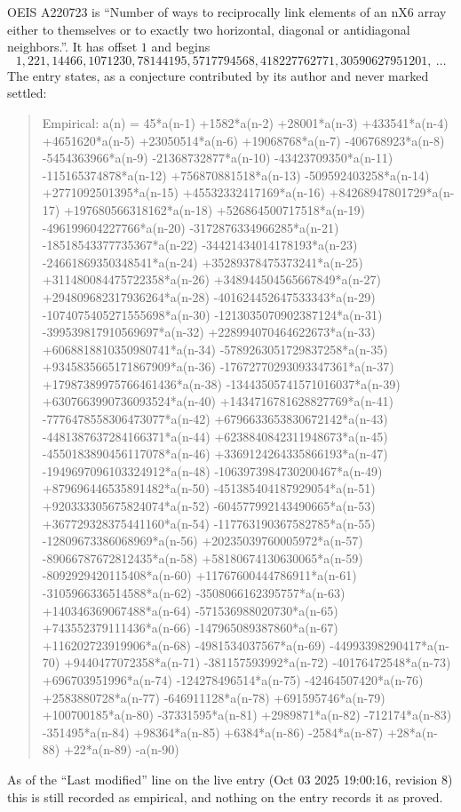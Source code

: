 \documentclass[11pt,a4paper]{article}
\theoremstyle{plain}
\theoremstyle{definition}
\begin{document}
OEIS A220723 is ``Number of ways to reciprocally link elements of an nX6 array either to themselves or to exactly two horizontal, diagonal or antidiagonal neighbors.''. It has offset $1$ and begins
\[
1, 221, 14466, 1071230, 78144195, 5717794568, 418227762771, 30590627951201,\ \dots
\]
The entry states, as a conjecture contributed by its author and never marked settled:
\begin{quote}
Empirical: a(n) = 45*a(n-1) +1582*a(n-2) +28001*a(n-3) +433541*a(n-4) +4651620*a(n-5) +23050514*a(n-6) +19068768*a(n-7) -406768923*a(n-8) -5454363966*a(n-9) -21368732877*a(n-10) -43423709350*a(n-11) -115165374878*a(n-12) +756870881518*a(n-13) -509592403258*a(n-14) +2771092501395*a(n-15) +45532332417169*a(n-16) +84268947801729*a(n-17) +197680566318162*a(n-18) +526864500717518*a(n-19) -496199604227766*a(n-20) -3172876334966285*a(n-21) -18518543377735367*a(n-22) -34421434014178193*a(n-23) -24661869350348541*a(n-24) +35289378475373241*a(n-25) +311480084475722358*a(n-26) +348944504565667849*a(n-27) +294809682317936264*a(n-28) -401624452647533343*a(n-29) -1074075405271555698*a(n-30) -1213035070902387124*a(n-31) -399539817910569697*a(n-32) +228994070464622673*a(n-33) +6068818810350980741*a(n-34) -5789263051729837258*a(n-35) +9345835665171867909*a(n-36) -17672770293093347361*a(n-37) +17987389975766461436*a(n-38) -13443505741571016037*a(n-39) +6307663990736093524*a(n-40) +1434716781628827769*a(n-41) -7776478558306473077*a(n-42) +6796633653830672142*a(n-43) -4481387637284166371*a(n-44) +6238840842311948673*a(n-45) -4550183890456117078*a(n-46) +3369124264335866193*a(n-47) -1949697096103324912*a(n-48) -1063973984730200467*a(n-49) +879696446535891482*a(n-50) -451385404187929054*a(n-51) +920333305675824074*a(n-52) -604577992143490665*a(n-53) +367729328375441160*a(n-54) -117763190367582785*a(n-55) -12809673386068969*a(n-56) +20235039760005972*a(n-57) -89066787672812435*a(n-58) +58180674130630065*a(n-59) -8092929420115408*a(n-60) +11767600444786911*a(n-61) -3105966336514588*a(n-62) -3508066162395757*a(n-63) +140346369067488*a(n-64) -571536988020730*a(n-65) +743552379111436*a(n-66) -147965089387860*a(n-67) +116202723919906*a(n-68) -4981534037567*a(n-69) -44993398290417*a(n-70) +9440477072358*a(n-71) -381157593992*a(n-72) -40176472548*a(n-73) +696703951996*a(n-74) -124278496514*a(n-75) -42464507420*a(n-76) +2583880728*a(n-77) -646911128*a(n-78) +691595746*a(n-79) +100700185*a(n-80) -37331595*a(n-81) +2989871*a(n-82) -712174*a(n-83) -351495*a(n-84) +98364*a(n-85) +6384*a(n-86) -2584*a(n-87) +28*a(n-88) +22*a(n-89) -a(n-90)
\end{quote}
As of the ``Last modified'' line on the live entry (Oct 03 2025 19:00:16, revision 8) this is still
recorded as empirical, and nothing on the entry records it as proved.
\end{document}
